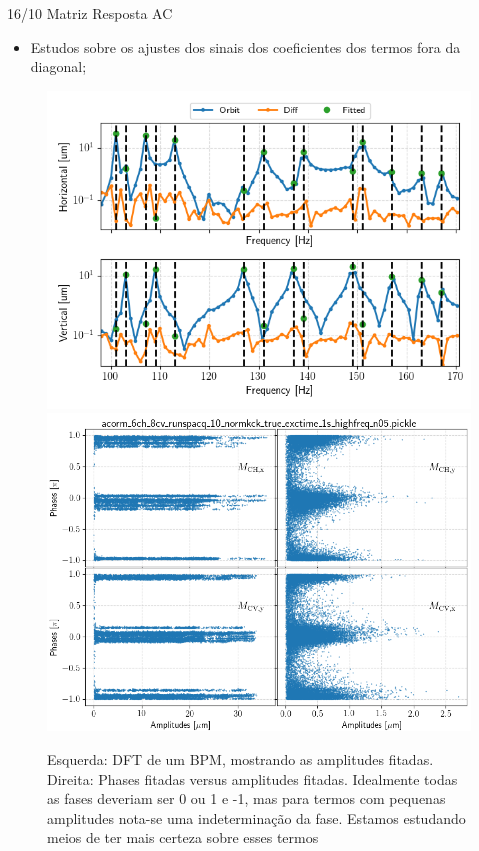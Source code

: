 \documentclass{beamer}					  %
\begin{document}
\begin{frame}{16/10 Matriz Resposta AC}
    \begin{itemize}
        \item Estudos sobre os ajustes dos sinais dos coeficientes dos termos fora da diagonal;
	\end{itemize}
    \begin{figure}[H]
		\centering
        \includegraphics[width=.48\textwidth]{2023-10-27/figures/fitted_freqs.png}
        \includegraphics[width=.48\textwidth]{2023-10-27/figures/phases_vs_amplitudes.png}
        \caption*{{\footnotesize Esquerda: DFT de um BPM, mostrando as amplitudes fitadas. Direita: Phases fitadas versus amplitudes fitadas. Idealmente todas as fases deveriam ser 0 ou 1 e -1, mas para termos com pequenas amplitudes nota-se uma indeterminação da fase. Estamos estudando meios de ter mais certeza sobre esses termos}}
        \label{fig:figure1}
    \end{figure}
\end{frame}
\end{document}
